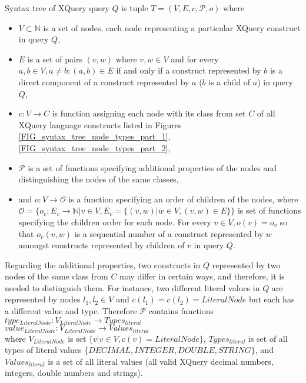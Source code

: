 \begin{define}
\label{DEF_syntax_tree}
Syntax tree of XQuery query $Q$ is tuple $T = (V, E, c, \mathcal{P}, o)$ where
\begin{itemize}
\item $V \subset \mathbb{N}$ is a set of nodes, each node representing a particular XQuery construct in query $Q$,
\item $E$ is a set of pairs $(v, w)$ where $v,w \in V$ and for every $a, b \in V, a \neq b: (a, b) \in E$ if and only if a construct represented by $b$ is a direct component of a construct represented by $a$ ($b$ is a child of $a$) in query $Q$,
\item $c: V \rightarrow C$ is function assigning each node with its class from set $C$ of all XQuery language constructs listed in Figures \ref{FIG_syntax_tree_node_types_part_1}, \ref{FIG_syntax_tree_node_types_part_2},
\item $\mathcal{P}$ is a set of functions specifying additional properties of the nodes and distinguishing the nodes of the same classes,
\item and $o : V \rightarrow \mathcal{O}$ is a function specifying an order of children of the nodes, where $\mathcal{O} = \{o_v : E_v \rightarrow \mathbb{N} | v \in V, E_v = \{(v, w) | w \in V, (v,w) \in E\}\}$ is set of functions specifying the children order for each node. For every $v \in V, o(v) = o_v$ so that $o_v(v,w)$ is a sequential number of a construct represented by $w$ amongst constructs represented by children of $v$ in query $Q$.
\end{itemize}
\end{define}

Regarding the additional properties, two constructs in $Q$ represented by two nodes of the same class from $C$ may differ in certain ways, and therefore, it is needed to distinguish them. For instance, two different literal values in $Q$ are represented by nodes $l_1, l_2 \in V$ and $c(l_1) = c(l_2) = LiteralNode$ but each has a different value and type. Therefore $\mathcal{P}$ contains functions \\
$type_{LiteralNode}: V_{LiteralNode} \rightarrow Types_{literal}$ \\
$value_{LiteralNode}: V_{LiteralNode} \rightarrow Values_{literal}$ \\
where $V_{LiteralNode}$ is set $\{v | v \in V, c(v) = LiteralNode\}$, $Types_{literal}$ is set of all types of literal values $\{DECIMAL, INTEGER, DOUBLE, STRING\}$, and $Values_{literal}$ is a set of all literal values (all valid XQuery decimal numbers, integers, double numbers and strings).

